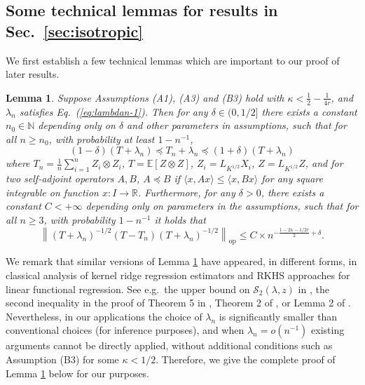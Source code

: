 \documentclass[11pt,a4paper]{article}
\theoremstyle{definition}
\theoremstyle{plain}
\newtheorem{lemma}{Lemma}[section]
\theoremstyle{remark}
\newcommand{\op}{\mathrm{op}}
\begin{document}
\subsection{Some technical lemmas for results in Sec.~\ref{sec:isotropic}}

We first establish a few technical lemmas which are important to our proof of later results.
\begin{lemma}
Suppose Assumptions (A1), (A3) and (B3) hold with $\kappa<\frac{1}{2}-\frac{1}{4r}$, and $\lambda_n$ satisfies Eq.~(\ref{eq:lambdan-1}). Then for any $\delta\in(0,1/2]$ there exists a constant $n_0\in\mathbb N$ depending only on $\delta$ and other parameters in assumptions,
 such that for all $n\geq n_0$, with probability at least $1-n^{-1}$,
$$
(1-\delta)(T+\lambda_n)\preceq T_n+\lambda_n \preceq (1+\delta)(T+\lambda_n)
$$
where $T_n=\frac{1}{n}\sum_{i=1}^n Z_i\otimes Z_i$, $T=\mathbb E[Z\otimes Z]$, $Z_i=L_{K^{1/2}}X_i$, $Z=L_{K^{1/2}}Z$, and for two self-adjoint operators $A,B$, $A\preceq B$ if $\langle x,Ax\rangle\leq \langle x, Bx\rangle$
for any square integrable on function $x:I\to\mathbb R$.
Furthermore, for any $\delta>0$, there exists a constant $C<+\infty$ depending only on parameters in the assumptions, such that for all $n\geq 3$, with probability $1-n^{-1}$ it holds that
$$
\left\|(T+\lambda_n)^{-1/2}(T-T_n)(T+\lambda_n)^{-1/2}\right\|_\op \leq C\times n^{-\frac{1-2\kappa-1/2r}{2}+\delta}.
$$
\label{lem:empirical-population-cov}
\end{lemma}

We remark that similar versions of Lemma \ref{lem:empirical-population-cov} have appeared, in different forms, in classical analysis of kernel ridge regression estimators and RKHS approaches for linear functional regression.
See e.g.~the upper bound on $\mathcal S_2(\lambda,z)$ in \citep{caponnetto2007optimal}, the second inequality in the proof of Theorem 5 in \citep{smale2007learning}, 
Theorem 2 of \citep{hsu2014random},
or Lemma 2 of \citep{cai2012minimax}.
Nevertheless, in our applications the choice of $\lambda_n$ is significantly smaller than conventional choices (for inference purposes), and when $\lambda_n = o(n^{-1})$ existing arguments cannot be directly applied,
without additional conditions such as Assumption (B3) for some $\kappa<1/2$. Therefore, we give the complete proof of Lemma \ref{lem:empirical-population-cov} below for our purposes.
\end{document}
